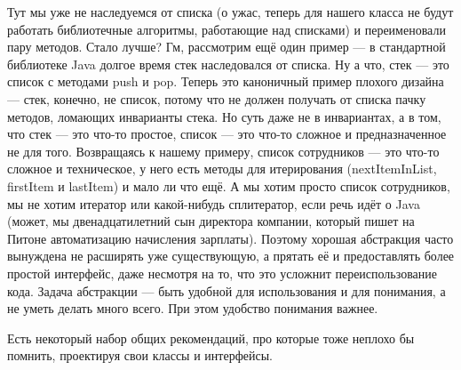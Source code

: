 \documentclass[a5paper]{article}
\begin{document}
Тут мы уже не наследуемся от списка (о ужас, теперь для нашего класса не будут работать библиотечные алгоритмы, работающие над списками) и переименовали пару методов. Стало лучше? Гм, рассмотрим ещё один пример --- в стандартной библиотеке Java долгое время стек наследовался от списка. Ну а что, стек --- это список с методами push и pop. Теперь это каноничный пример плохого дизайна --- стек, конечно, не список, потому что не должен получать от списка пачку методов, ломающих инварианты стека. Но суть даже не в инвариантах, а в том, что стек --- это что-то простое, список --- это что-то сложное и предназначенное не для того. Возвращаясь к нашему примеру, список сотрудников --- это что-то сложное и техническое, у него есть методы для итерирования (nextItemInList, firstItem и lastItem) и мало ли что ещё. А мы хотим просто список сотрудников, мы не хотим итератор или какой-нибудь сплитератор, если речь идёт о Java (может, мы двенадцатилетний сын директора компании, который пишет на Питоне автоматизацию начисления зарплаты). Поэтому хорошая абстракция часто вынуждена не расширять уже существующую, а прятать её и предоставлять более простой интерфейс, даже несмотря на то, что это усложнит переиспользование кода. Задача абстракции --- быть удобной для использования и для понимания, а не уметь делать много всего. При этом удобство понимания важнее.

Есть некоторый набор общих рекомендаций, про которые тоже неплохо бы помнить, проектируя свои классы и интерфейсы.
\end{document}
